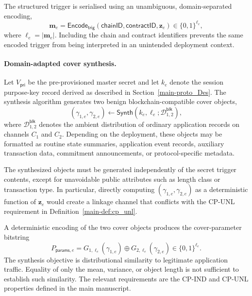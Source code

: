 \documentclass[journal]{IEEEtran}
\theoremstyle{definition}
\theoremstyle{game}
\begin{document}
The structured trigger is serialised using an unambiguous,
domain-separated encoding,
\begin{equation}
\label{eq:blockchain_trigger_encoding}
\mathbf{m}_{e}
=
\mathsf{Encode}_{\mathsf{trig}}
\left(
\mathsf{chainID},
\mathsf{contractID},
\mathbf{z}_{e}
\right)
\in
\{0,1\}^{\ell_e},
\end{equation}
where $\ell_e=|\mathbf{m}_{e}|$. Including the chain and contract
identifiers prevents the same encoded trigger from being
interpreted in an unintended deployment context.

\paragraph{Domain-adapted cover synthesis.}
Let $V_{\mathsf{pri}}$ be the pre-provisioned master secret and
let $k_e$ denote the session purpose-key record derived
as described in Section~\ref{main-proto_Des}. The synthesis algorithm
generates two benign blockchain-compatible cover objects,
\begin{equation}
\label{eq:blockchain_synth}
\left(
\gamma_{1,e},
\gamma_{2,e}
\right)
\leftarrow
\mathsf{Synth}
\left(
k_e,\ell_e;
\mathcal{D}^{\mathsf{blk}}_{1,2}
\right),
\end{equation}
where $\mathcal{D}^{\mathsf{blk}}_{1,2}$ denotes the ambient
distribution of ordinary application records on channels $C_1$
and $C_2$. Depending on the deployment, these objects may be
formatted as routine state summaries, application event records,
auxiliary transaction data, commitment announcements, or
protocol-specific metadata.

The synthesized objects must be generated independently of the
secret trigger contents, except for unavoidable public attributes
such as length class or transaction type. In particular, directly
computing
$(\gamma_{1,e},\gamma_{2,e})$ as a deterministic function of
$\mathbf{z}_{e}$ would create a linkage channel that conflicts
with the \textsf{CP-UNL} requirement in
Definition~\ref{main-def:cp_unl}.

A deterministic encoding of the two cover objects produces the
cover-parameter bitstring
\begin{equation}
\label{eq:blockchain_pparams}
P_{\mathsf{params},e}=G_{1,\ell_e}(\gamma_{1,e})\oplus G_{2,\ell_e}(\gamma_{2,e})\in\{0,1\}^{\ell_e}.
\end{equation}
The synthesis objective is distributional similarity to legitimate
application traffic. Equality of only the mean, variance, or object
length is not sufficient to establish such similarity. The relevant
requirements are the \textsf{CP-IND} and \textsf{CP-UNL}
properties defined in the main manuscript.
\end{document}
